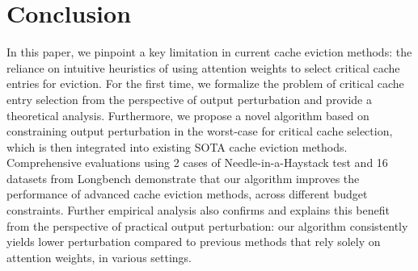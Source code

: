 \section{Conclusion}

In this paper, we pinpoint a key limitation in current cache eviction methods: the reliance on intuitive heuristics of using attention weights to select critical cache entries for eviction. For the first time, we formalize the problem of critical cache entry selection from the perspective of output perturbation and provide a theoretical analysis. Furthermore, we propose a novel algorithm based on constraining output perturbation in the worst-case for critical cache selection, which is then integrated into existing SOTA cache eviction methods. Comprehensive evaluations using 2 cases of Needle-in-a-Haystack test and 16 datasets from Longbench demonstrate that our algorithm improves the performance of advanced cache eviction methods, across different budget constraints. Further empirical analysis also confirms and explains this benefit from the perspective of practical output perturbation: our algorithm consistently yields lower perturbation compared to previous methods that rely solely on attention weights, in various settings.
